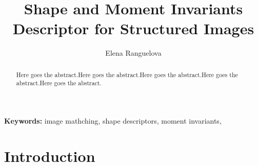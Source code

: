 \documentclass[a4paper,11pt]{article}
\begin{document}
\title{Shape and Moment Invariants Descriptor for Structured Images}

\author{Elena Ranguelova}
\date{}
\maketitle
\thispagestyle{empty}



\begin{abstract}
Here goes the abstract.Here goes the abstract.Here goes the abstract.Here goes the abstract.Here goes the abstract.
\end{abstract}
\textbf{Keywords:} image mathching, shape descriptors, moment invariants, 



\section{Introduction}
 
\end{document}

